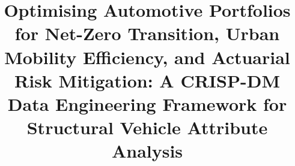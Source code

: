 \documentclass[conference]{IEEEtran}
\begin{document}

\title{Optimising Automotive Portfolios for Net-Zero Transition,
Urban Mobility Efficiency, and Actuarial Risk Mitigation:
A CRISP-DM Data Engineering Framework for Structural
Vehicle Attribute Analysis}

\author{
}

\maketitle
\end{document}
